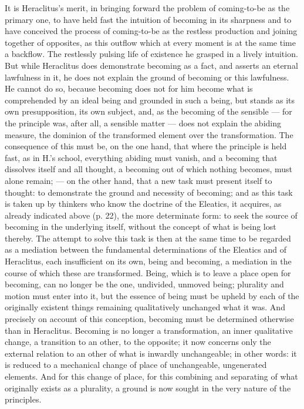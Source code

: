 It is Heraclitus's merit, in bringing forward the problem of
coming-to-be as the primary one, to have held fast the intuition of
becoming in its sharpness and to have conceived the process of
coming-to-be as the restless production and joining together of
opposites, as this outflow which at every moment is at the same time a
backflow. The restlessly pulsing life of existence he grasped in a
lively intuition. But while Heraclitus does demonstrate becoming as a
fact, and asserts an eternal lawfulness in it, he does not explain the
ground of becoming or this lawfulness. He cannot do so, because
becoming does not for him become what is comprehended by an ideal being
and grounded in such a being, but stands as its own presupposition, its
own subject, and, as the becoming of the sensible --- for the principle
was, after all, a sensible matter --- does not explain the abiding
measure, the dominion of the transformed element over the
transformation. The consequence of this must be, on the one hand, that
where the principle is held fast, as in H.'s school, everything abiding
must vanish, and a becoming that dissolves itself and all thought, a
becoming out of which nothing becomes, must alone remain; --- on the
other hand, that a new task must present itself to thought: to
demonstrate the ground and necessity of becoming; and as this task is
taken up by thinkers who know the doctrine of the Eleatics, it
acquires, as already indicated above (p. 22), the more determinate
form: to seek the source of becoming in the underlying itself, without
the concept of what is being lost thereby. The attempt to solve this
task is then at the same time to be regarded as a mediation between the
fundamental determinations of the Eleatics and of Heraclitus, each
insufficient on its own, being and becoming, a mediation in the course of which
these are transformed. Being, which is to leave a place open for
becoming, can no longer be the one, undivided, unmoved being; plurality
and motion must enter into it, but the essence of being must be upheld
by each of the originally existent things remaining
qualitatively unchanged what it was. And precisely on account of this
conception, becoming must be determined otherwise than in Heraclitus.
Becoming is no longer a transformation, an inner qualitative change, a
transition to an other, to the opposite; it now concerns only the
external relation to an other of what is inwardly unchangeable; in
other words: it is reduced to a mechanical change of place of
unchangeable, ungenerated elements. And for this change of place, for
this combining and separating of what originally exists as a plurality,
a ground is now sought in the very nature of the principles.

